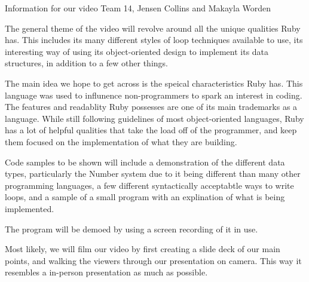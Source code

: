 Information for our video
Team 14, Jensen Collins and Makayla Worden

The general theme of the video will revolve around all the unique qualities Ruby has. This includes its many different styles of loop techniques available to use, its interesting way of using its object-oriented design to implement its data structures, in addition to a few other things. 

The main idea we hope to get across is the speical characteristics Ruby has. This language was used to influnence non-programmers to spark an interest in coding. The features and readablity Ruby possesses are one of its main trademarks as a language. While still following guidelines of most object-oriented languages, Ruby has a lot of helpful qualities that take the load off of the programmer, and keep them focused on the implementation of what they are building.

Code samples to be shown will include a demonstration of the different data types, particularly the Number system due to it being different than many other programming languages, a few different syntactically acceptabtle ways to write loops, and a sample of a small program with an explination of what is being implemented.

The program will be demoed by using a screen recording of it in use.

Most likely, we will film our video by first creating a slide deck of our main points, and walking the viewers through our presentation on camera. This way it resembles a in-person presentation as much as possible.

